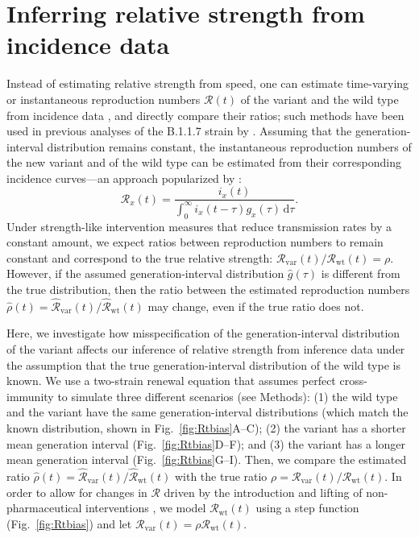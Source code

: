 \documentclass[12pt]{article}
\newcommand{\fref}[1]{Fig.~\ref{fig:#1}}
\newcommand{\vvvar}{\mathrm{var}}
\newcommand{\wwwt}{\mathrm{wt}}
\newcommand{\Rx}[1]{\ensuremath{{\mathcal R}_{#1}}\xspace}
\newcommand{\RR}{\ensuremath{{\mathcal R}}\xspace}
\newcommand{\Rw}{\Rx{\wwwt}}
\newcommand{\Rv}{\Rx{\vvvar}}
\newcommand{\dd}[1]{\ensuremath{\, \mathrm{d}#1}}
\newcommand{\dtau}{\dd{\tau}}
\begin{document}
\section{Inferring relative strength from incidence data}

Instead of estimating relative strength from speed, one can estimate time-varying or instantaneous reproduction numbers $\RR(t)$ of the variant and the wild type from incidence data \citep{fraser2007estimating}, and directly compare their ratios;
such methods have been used in previous analyses of the B.1.1.7 strain by \cite{volz2021transmission}.
Assuming that the generation-interval distribution remains constant, the instantaneous reproduction numbers of the new variant and of the wild type can be estimated from their corresponding incidence curves---an approach popularized by \cite{cori2013new}:
\begin{equation}
\RR_x(t) = \frac{i_x(t)}{\int_0^\infty i_x(t-\tau) g_x(\tau) \dtau}.
\label{eq:rt}
\end{equation}
Under strength-like intervention measures that reduce transmission rates by a constant amount, we expect ratios between reproduction numbers to remain constant and correspond to the true relative strength: $\Rv(t)/\Rw(t) = \rho$.
However, if the assumed generation-interval distribution $\hat{g}(\tau)$ is different from the true distribution, then the ratio between the estimated reproduction numbers $\hat{\rho}(t) = \hat{\RR}_{\textrm{var}}(t)/\hat{\RR}_{\textrm{wt}}(t)$ may change, even if the true ratio does not.

Here, we investigate how misspecification of the generation-interval distribution of the variant affects our inference of relative strength from inference data under the assumption that the true generation-interval distribution of the wild type is known.
We use a two-strain renewal equation that assumes perfect cross-immunity to simulate three different scenarios (see Methods):  
(1) the wild type and the variant have the same generation-interval distributions (which match the known distribution, shown in \fref{Rtbias}A--C);
(2) the variant has a shorter mean generation interval (\fref{Rtbias}D--F); and
(3) the variant has a longer mean generation interval (\fref{Rtbias}G--I).
Then, we compare the estimated ratio $\hat{\rho}(t) = \hat{\RR}_{\textrm{var}}(t)/\hat{\RR}_{\textrm{wt}}(t)$ with the true ratio $\rho = \Rv(t)/\Rw(t)$.
In order to allow for changes in $\RR$ driven by the introduction and lifting of non-pharmaceutical interventions \citep{flaxman2020Rt}, we model $\Rw(t)$ using a step function (\fref{Rtbias}) and let $\Rv(t) = \rho \Rw(t)$.
\end{document}
